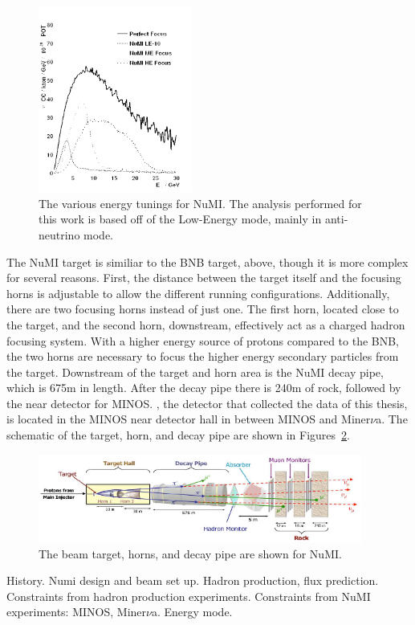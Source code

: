 \begin{figure}[htbp]
  \centering
  \includegraphics[width=0.45\textwidth]{beams_figures/numi_focus_vs_perfect.png}
  \caption[NuMI Energy Modes]{The various energy tunings for NuMI.  The analysis performed for this work is based off of the Low-Energy mode, mainly in anti-neutrino mode.}
  \label{fig:numi_spectra}
\end{figure}

The NuMI target is similiar to the BNB target, above, though it is more complex for several reasons.  First, the distance between the target itself and the focusing horns is adjustable to allow the different running configurations.  Additionally, there are two focusing horns instead of just one.  The first horn, located close to the target, and the second horn, downstream, effectively act as a charged hadron focusing system.  With a higher energy source of protons compared to the BNB, the two horns are necessary to focus the higher energy secondary particles from the target.  Downstream of the target and horn area is the NuMI decay pipe, which is 675m in length.  After the decay pipe there is 240m of rock, followed by the near detector for MINOS.  \argoneut, the detector that collected the data of this thesis, is located in the MINOS near detector hall in between MINOS and Miner{$\nu$}a.
The schematic of the target, horn, and decay pipe are shown in Figures~\ref{fig:numi_horn}.

\begin{figure}[htbp]
  \centering
  \includegraphics[width=0.95\textwidth]{beams_figures/numi_beam_target.png}
  \caption[NuMI Beam Target]{The beam target, horns, and decay pipe are shown for NuMI.}
  \label{fig:numi_horn}
\end{figure}



History. Numi design and beam set up.  Hadron production, flux prediction.  Constraints from hadron production experiments.  Constraints from NuMI experiments: MINOS, Miner$\nu$a.  Energy mode.

